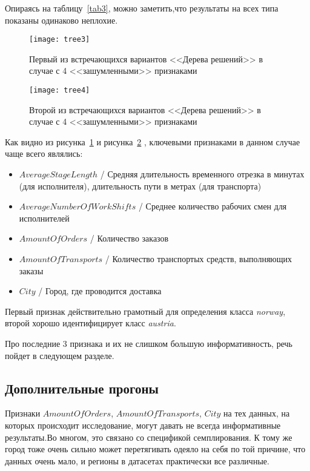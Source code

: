 Опираясь на таблицу~\ref{tab3}, можно заметить,что результаты на всех типа показаны одинаково неплохие.

\begin{figure}[h]
	\caption{Первый из встречающихся вариантов <<Дерева решений>> в случае с 4 <<зашумленными>> признаками \label{tree3}} \centering
	\texttt{[image: tree3]}
\end{figure}

\begin{figure}[h]
	\caption{Второй из встречающихся вариантов <<Дерева решений>> в случае с 4 <<зашумленными>> признаками \label{tree4}} \centering
	\texttt{[image: tree4]}
\end{figure}

Как видно из рисунка~\ref{tree3} и рисунка~\ref{tree4} , ключевыми признаками в данном случае чаще всего являлись:
\begin{itemize}
	\item $AverageStageLength$ / Средняя длительность временного отрезка в минутах (для исполнителя), длительность пути в метрах (для транспорта)
	\item $AverageNumberOfWorkShifts$ / Среднее количество рабочих смен для исполнителей
	\item $AmountOfOrders$ / Количество заказов
	\item $AmountOfTransports$ / Количество транспортых средств, выполняющих заказы
	\item $City$ / Город, где проводится доставка
\end{itemize}

Первый признак действительно грамотный для определения класса \textit{norway}, второй хорошо идентифицирует класс \textit{austria}.

Про последние 3 признака и их не слишком большую информативность, речь пойдет в следующем разделе.

\subsection{Дополнительные прогоны}

Признаки $AmountOfOrders$, $AmountOfTransports$, $City$ на тех данных, на которых происходит исследование, могут давать не всегда информативные результаты.Во многом, это связано со спецификой семплирования. К тому же город тоже очень сильно может перетягивать одеяло на себя по той причине, что данных очень мало, и регионы в датасетах практически все различные.

